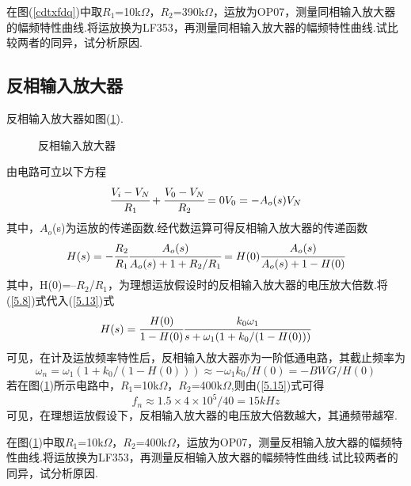 \documentclass[a4paper]{article}
\begin{document}
在图(\ref{cdtxfdq})中取$R_1$=10k$\Omega$，$R_2$=390k$\Omega$，运放为OP07，测量同相输入放大器的幅频特性曲线.将运放换为LF353，再测量同相输入放大器的幅频特性曲线.试比较两者的同异，试分析原因.

\subsection{反相输入放大器}
反相输入放大器如图(\ref{cdfxfdq}).
\begin{figure}[!h]
\centering
{}
\caption{反相输入放大器}\label{cdfxfdq}
\end{figure}
由电路可立以下方程
\begin{equation}
\cfrac{V_i - V_N}{R_1} + \cfrac{V_0 - V_N}{R_2} = 0\\
V_0 = -A_o(s)V_N\label{5.12}
\end{equation}
其中，$A_o$(s)为运放的传递函数.经代数运算可得反相输入放大器的传递函数
\begin{equation}
H(s) = -\cfrac{R_2}{R_1}\cfrac{A_o(s)}{A_o(s)+1+R_2/R_1} = H(0)\cfrac{A_o(s)}{A_o(s)+1-H(0)}\label{5.13}
\end{equation}
其中，H(0)=–$R_2$/$R_1$，为理想运放假设时的反相输入放大器的电压放大倍数.将(\ref{5.8})式代入(\ref{5.13})式
\begin{equation}
H(s) = \cfrac{H(0)}{1-H(0)}\cfrac{k_0\omega_1}{s+\omega_1(1+k_0/(1-H(0)))}\label{5.14}
\end{equation}
可见，在计及运放频率特性后，反相输入放大器亦为一阶低通电路，其截止频率为
\begin{equation}
\omega_n = \omega_1(1+k_0/(1-H(0))) \approx -\omega_1k_0/H(0) = -BWG/H(0)\label{5.15}
\end{equation}
若在图(\ref{cdfxfdq})所示电路中，$R_1$=10k$\Omega$，$R_2$=400k$\Omega$,则由(\ref{5.15})式可得
\begin{equation}
f_n \approx 1.5\times 4\times 10^5/40 = 15kHz\label{5.16}
\end{equation}
可见，在理想运放假设下，反相输入放大器的电压放大倍数越大，其通频带越窄.

在图(\ref{cdfxfdq})中取$R_1$=10k$\Omega$，$R_2$=400k$\Omega$，运放为OP07，测量反相输入放大器的幅频特性曲线.将运放换为LF353，再测量反相输入放大器的幅频特性曲线.试比较两者的同异，试分析原因.
\end{document}
